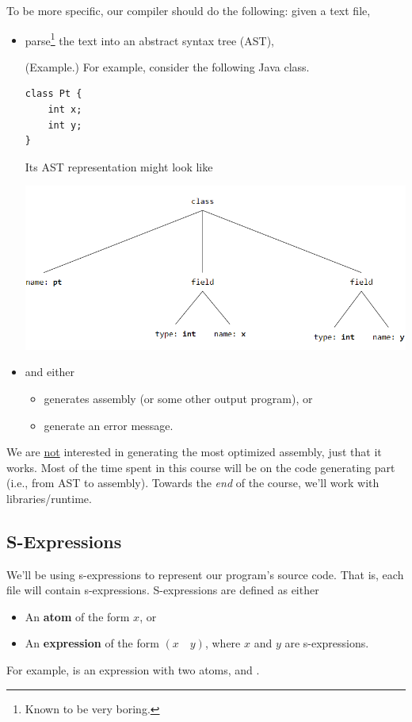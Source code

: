 To be more specific, our compiler should do the following: given a  text file, 
\begin{itemize}
    \item parse\footnote{Known to be very boring.} the text into an abstract syntax tree (AST), 
    \begin{mdframed}
        (Example.) For example, consider the following Java class. 
\begin{verbatim}
class Pt {
    int x; 
    int y; 
}\end{verbatim}
        Its AST representation might look like 
        \begin{center}
            \includegraphics[scale=0.8]{assets/ast.png}
        \end{center}
    \end{mdframed}
    \item and either 
    \begin{itemize}
        \item generates assembly (or some other output program), or 
        \item generate an error message.
    \end{itemize}
\end{itemize}
We are \underline{not} interested in generating the most optimized assembly, just that it works. Most of the time spent in this course will be on the code generating part (i.e., from AST to assembly). Towards the \emph{end} of the course, we'll work with libraries/runtime.

\subsection{S-Expressions}
We'll be using s-expressions to represent our program's source code. That is, each  file will contain s-expressions. S-expressions are defined as either 
\begin{itemize}
    \item An \textbf{atom} of the form $x$, or 
    \item An \textbf{expression} of the form $(x \quad y)$, where $x$ and $y$ are s-expressions. 
\end{itemize}
For example,  is an expression with two atoms,  and . 

